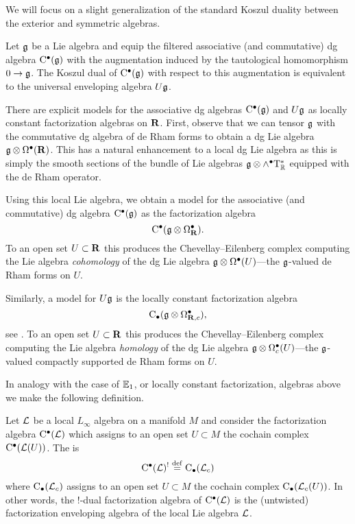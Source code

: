 We will focus on a slight generalization of the standard Koszul duality between the exterior and symmetric algebras.

\begin{prop}
Let $\mathfrak{g}$ be a Lie algebra and equip the filtered associative (and commutative) dg algebra ${\rm C}^\bullet(\mathfrak g)$ with the augmentation induced by the tautological homomorphism $0 \to \mathfrak{g}$.
The Koszul dual of ${\rm C}^\bullet(\mathfrak{g})$ with respect to this augmentation is equivalent to the universal enveloping algebra $U \mathfrak g$. 
\end{prop}

There are explicit models for the associative dg algebras ${\rm C}^\bullet(\mathfrak{g})$ and $U \mathfrak{g}$ as locally constant factorization algebras on $\mathbf{R}$.
First, observe that we can tensor $\mathfrak g$ with the commutative dg algebra of de Rham forms to obtain a dg Lie algebra $\mathfrak g \otimes \Omega^\bullet(\mathbf{R})$. 
This has a natural enhancement to a local dg Lie algebra as this is simply the smooth sections of the bundle of Lie algebras $\mathfrak g \otimes \wedge^\bullet {\rm T}^*_\mathbb R$ equipped with the de Rham operator.

Using this local Lie algebra, we obtain a model for the associative (and commutative) dg algebra ${\rm C}^\bullet(\mathfrak g)$ as the factorization algebra
\[
{\rm C}^\bullet(\mathfrak g \otimes \Omega^\bullet_{\mathbf{R}}).
\]
To an open set $U \subset \mathbf{R}$ this produces the Chevellay--Eilenberg complex computing the Lie algebra {\em cohomology} of the dg Lie algebra $\mathfrak g \otimes \Omega^\bullet(U)$---the $\mathfrak g$-valued de Rham forms on $U$.
 
Similarly, a model for $U \mathfrak g$ is the locally constant factorization algebra
\[
{\rm C}_\bullet(\mathfrak g \otimes \Omega^\bullet_{\mathbf{R},c}),
\]
see \cite[\S 3.4]{CG1}.
To an open set $U \subset \mathbf{R}$ this produces the Chevellay--Eilenberg complex computing the Lie algebra {\em homology} of the dg Lie algebra $\mathfrak g \otimes \Omega^\bullet_c(U)$---the $\mathfrak g$-valued compactly supported de Rham forms on $U$.

\parsec[s:generalkoszul]

In analogy with the case of $\mathbb E_1$, or locally constant factorization, algebras above we make the following definition. 

\begin{dfn}
Let $\mathcal L$ be a local $L_\infty$ algebra on a manifold $M$ and consider the factorization algebra ${\rm C}^\bullet(\mathcal L)$ which assigns to an open set $U \subset M$ the cochain complex ${\rm C}^\bullet(\mathcal L(U))$. 
The  is 
\[
{\rm C}^\bullet(\mathcal L)^! \overset{\rm def}{=} {\rm C}_\bullet (\mathcal L_{c}) 
\]
where ${\rm C}_\bullet(\mathcal L_c)$ assigns to an open set $U \subset M$ the cochain complex ${\rm C}_\bullet(\mathcal L_c(U))$.
In other words, the $!$-dual factorization algebra of ${\rm C}^\bullet(\mathcal L)$ is the (untwisted) factorization enveloping algebra of the local Lie algebra $\mathcal L$. 
\end{dfn} 

